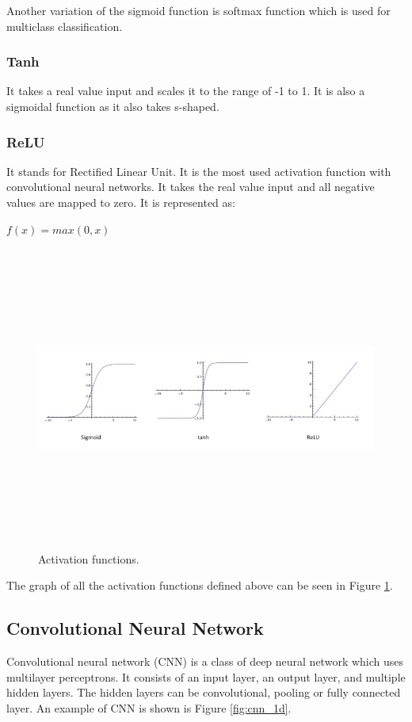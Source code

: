 Another variation of the sigmoid function is softmax function which is used for multiclass classification.

\subsubsection{Tanh}
It takes a real value input and scales it to the range of -1 to 1. It is also a sigmoidal function as it also takes s-shaped.


\subsubsection{ReLU}
It stands for Rectified Linear Unit. It is the most used activation function with convolutional neural networks\cite{ujjwalkarn}. It takes the real value input and all negative values are mapped to zero. It is represented as:

\begin{center}
	$f(x) = max(0, x)$
\end{center}

\begin{figure}[htpb]
	\centering
	\includegraphics[width=15cm,height=10cm,keepaspectratio=true]{images/act-funcs}
	\caption{
		Activation functions\cite{ujjwalkarn}.
	}
	\label{fig:funcs}
\end{figure}

The graph of all the activation functions defined above can be seen in Figure \ref{fig:funcs}.

\subsection{Convolutional Neural Network}
Convolutional neural network (CNN) is a class of deep neural network which uses multilayer perceptrons. It consists of an input layer, an output layer, and multiple hidden layers. The hidden layers can be convolutional, pooling or fully connected layer. An example of CNN is shown is Figure \ref{fig:cnn_1d}. 

